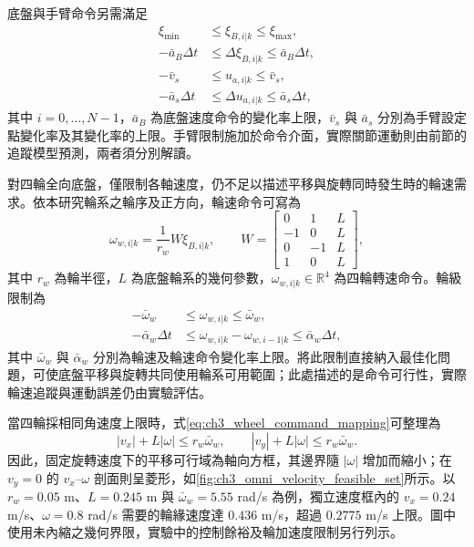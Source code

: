 底盤與手臂命令另需滿足
\begin{equation}
    \begin{aligned}
        \xi_{\min}
        &\leq\xi_{B,i|k}\leq\xi_{\max}, \\
        -\bar{a}_B\Delta t
        &\leq\Delta\xi_{B,i|k}\leq\bar{a}_B\Delta t, \\
        -\bar{v}_s
        &\leq u_{a,i|k}\leq\bar{v}_s, \\
        -\bar{a}_s\Delta t
        &\leq\Delta u_{a,i|k}\leq\bar{a}_s\Delta t,
    \end{aligned}
    \label{eq:ch3_command_rate_limits}
\end{equation}
其中 $i=0,\ldots,N-1$，$\bar{a}_B$ 為底盤速度命令的變化率上限，$\bar{v}_s$ 與 $\bar{a}_s$ 分別為手臂設定點變化率及其變化率的上限。手臂限制施加於命令介面，實際關節運動則由前節的追蹤模型預測，兩者須分別解讀。

對四輪全向底盤，僅限制各軸速度，仍不足以描述平移與旋轉同時發生時的輪速需求。依本研究輪系之輪序及正方向，輪速命令可寫為
\begin{equation}
    \omega_{w,i|k}
    =\frac{1}{r_w}W\xi_{B,i|k},
    \qquad
    W=
    \begin{bmatrix}
        0 & 1 & L \\
        -1 & 0 & L \\
        0 & -1 & L \\
        1 & 0 & L
    \end{bmatrix},
    \label{eq:ch3_wheel_command_mapping}
\end{equation}
其中 $r_w$ 為輪半徑，$L$ 為底盤輪系的幾何參數，$\omega_{w,i|k}\in\mathbb{R}^{4}$ 為四輪轉速命令。輪級限制為
\begin{equation}
    \begin{aligned}
        -\bar{\omega}_w
        &\leq\omega_{w,i|k}\leq\bar{\omega}_w, \\
        -\bar{\alpha}_w\Delta t
        &\leq\omega_{w,i|k}-\omega_{w,i-1|k}
          \leq\bar{\alpha}_w\Delta t,
    \end{aligned}
    \label{eq:ch3_wheel_speed_acceleration_limits}
\end{equation}
其中 $\bar{\omega}_w$ 與 $\bar{\alpha}_w$ 分別為輪速及輪速命令變化率上限。將此限制直接納入最佳化問題，可使底盤平移與旋轉共同使用輪系可用範圍；此處描述的是命令可行性，實際輪速追蹤與運動誤差仍由實驗評估。

當四輪採相同角速度上限時，式\eqref{eq:ch3_wheel_command_mapping}可整理為
\begin{equation}
    |v_x|+L|\omega|\leq r_w\bar\omega_w,
    \qquad
    |v_y|+L|\omega|\leq r_w\bar\omega_w.
    \label{eq:ch3_omni_velocity_feasible_region}
\end{equation}
因此，固定旋轉速度下的平移可行域為軸向方框，其邊界隨 $|\omega|$ 增加而縮小；在 $v_y=0$ 的 $v_x$--$\omega$ 剖面則呈菱形，如\cref{fig:ch3_omni_velocity_feasible_set}所示。以 $r_w=0.05$ m、$L=0.245$ m 與 $\bar\omega_w=5.55$ rad/s 為例，獨立速度框內的 $v_x=0.24$ m/s、$\omega=0.8$ rad/s 需要的輪緣速度達 $0.436$ m/s，超過 $0.2775$ m/s 上限。圖中使用未內縮之幾何界限，實驗中的控制餘裕及輪加速度限制另行列示。

